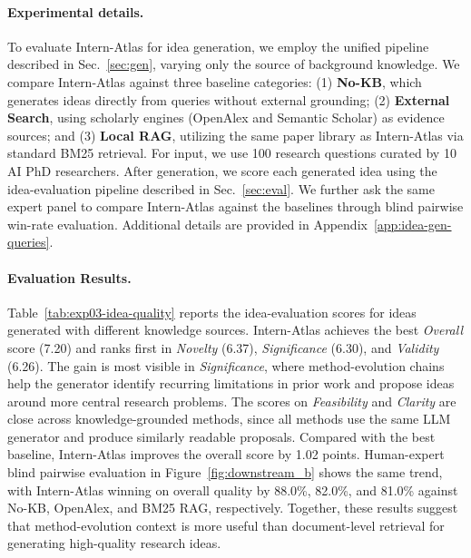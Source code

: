 \documentclass{llmxive}
\begin{document}
\paragraph{Experimental details.}
To evaluate Intern-Atlas for idea generation, we employ the unified pipeline described in Sec.~\ref{sec:gen}, varying only the source of background knowledge. We compare Intern-Atlas against three baseline categories: (1) \textbf{No-KB}, which generates ideas directly from queries without external grounding; (2) \textbf{External Search}, using scholarly engines (OpenAlex and Semantic Scholar) as evidence sources; and (3) \textbf{Local RAG}, utilizing the same paper library as Intern-Atlas via standard BM25 retrieval. For input, we use 100 research questions curated by 10 AI PhD researchers. After generation, we score each generated idea using the idea-evaluation pipeline described in Sec.~\ref{sec:eval}. We further ask the same expert panel to compare Intern-Atlas against the baselines through blind pairwise win-rate evaluation. Additional details are provided in Appendix~\ref{app:idea-gen-queries}.

\paragraph{Evaluation Results.}
Table~\ref{tab:exp03-idea-quality} reports the idea-evaluation scores for ideas generated with different knowledge sources. Intern-Atlas achieves the best \textit{Overall} score (7.20) and ranks first in \textit{Novelty} (6.37), \textit{Significance} (6.30), and \textit{Validity} (6.26). The gain is most visible in \textit{Significance}, where method-evolution chains help the generator identify recurring limitations in prior work and propose ideas around more central research problems. The scores on \textit{Feasibility} and \textit{Clarity} are close across knowledge-grounded methods, since all methods use the same LLM generator and produce similarly readable proposals. Compared with the best baseline, Intern-Atlas improves the overall score by 1.02 points. Human-expert blind pairwise evaluation in Figure~\ref{fig:downstream_b} shows the same trend, with Intern-Atlas winning on overall quality by 88.0\%, 82.0\%, and 81.0\% against No-KB, OpenAlex, and BM25 RAG, respectively. Together, these results suggest that method-evolution context is more useful than document-level retrieval for generating high-quality research ideas.
\end{document}
